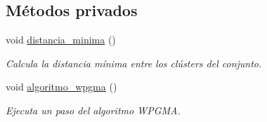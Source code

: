 \subsection*{Métodos privados}
\begin{DoxyCompactItemize}
\item 
void \hyperlink{class_cjt___clusters_ac0e4dd151f0bbd2954d44551330a8757}{distancia\+\_\+minima} ()
\begin{DoxyCompactList}\small\item\em Calcula la distancia mínima entre los clústers del conjunto. \end{DoxyCompactList}\item 
void \hyperlink{class_cjt___clusters_a04cfe3b7b8998398a48459f9a9339c22}{algoritmo\+\_\+wpgma} ()
\begin{DoxyCompactList}\small\item\em Ejecuta un paso del algoritmo W\+P\+G\+MA. \end{DoxyCompactList}\end{DoxyCompactItemize}
